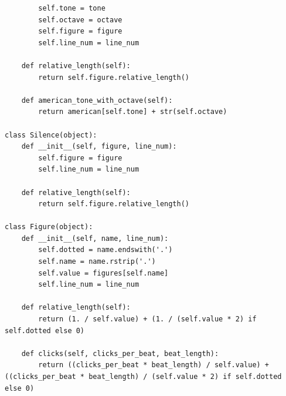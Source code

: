 \documentclass[a4paper, 10pt, twoside]{article}
\begin{document}
\begin{verbatim}
        self.tone = tone
        self.octave = octave
        self.figure = figure
        self.line_num = line_num

    def relative_length(self):
        return self.figure.relative_length()

    def american_tone_with_octave(self):
        return american[self.tone] + str(self.octave)

class Silence(object):
    def __init__(self, figure, line_num):        
        self.figure = figure
        self.line_num = line_num

    def relative_length(self):
        return self.figure.relative_length()

class Figure(object):
    def __init__(self, name, line_num):     
        self.dotted = name.endswith('.')
        self.name = name.rstrip('.')
        self.value = figures[self.name]
        self.line_num = line_num

    def relative_length(self):        
        return (1. / self.value) + (1. / (self.value * 2) if self.dotted else 0)
        
    def clicks(self, clicks_per_beat, beat_length):
        return ((clicks_per_beat * beat_length) / self.value) + ((clicks_per_beat * beat_length) / (self.value * 2) if self.dotted else 0)
\end{verbatim}
\end{document}
